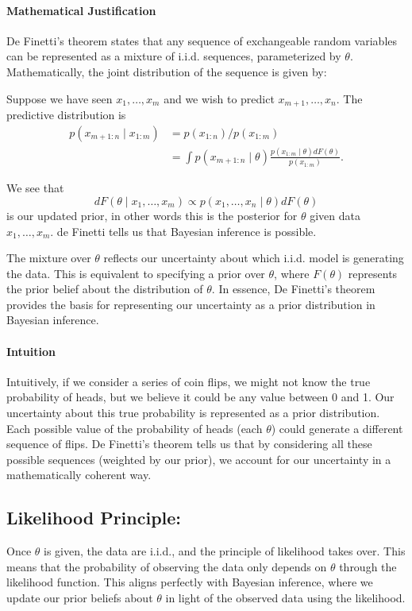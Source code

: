 \documentclass{article}
\begin{document}
\paragraph{Mathematical Justification}
De Finetti's theorem states that any sequence of exchangeable random variables can be represented as a mixture of i.i.d. sequences, parameterized by \( \theta \). Mathematically, the joint distribution of the sequence is given by:

Suppose we have seen $x_1, \ldots, x_m$ and we wish to predict $x_{m+1}, \ldots, x_n$. The predictive distribution is
$$
\begin{aligned}
p\left(x_{m+1: n} \mid x_{1: m}\right) & =p\left(x_{1: n}\right) / p\left(x_{1: m}\right) \\
& =\int p\left(x_{m+1: n} \mid \theta\right) \frac{p\left(x_{1: m} \mid \theta\right) d F(\theta)}{p\left(x_{1: m}\right)} .
\end{aligned}
$$

We see that
$$
d F\left(\theta \mid x_1, \ldots, x_m\right) \propto p\left(x_1, \ldots, x_n \mid \theta\right) d F(\theta)
$$
is our updated prior, in other words this is the posterior for $\theta$ given data $x_1, \ldots, x_m$. de Finetti tells us that Bayesian inference is possible.

The mixture over \( \theta \) reflects our uncertainty about which i.i.d. model is generating the data. This is equivalent to specifying a prior over \( \theta \), where \( F(\theta) \) represents the prior belief about the distribution of \( \theta \). In essence, De Finetti's theorem provides the basis for representing our uncertainty as a prior distribution in Bayesian inference.

\paragraph{Intuition}
Intuitively, if we consider a series of coin flips, we might not know the true probability of heads, but we believe it could be any value between 0 and 1. Our uncertainty about this true probability is represented as a prior distribution. Each possible value of the probability of heads (each \( \theta \)) could generate a different sequence of flips. De Finetti's theorem tells us that by considering all these possible sequences (weighted by our prior), we account for our uncertainty in a mathematically coherent way.






\subsection{Likelihood Principle:}
    Once \( \theta \) is given, the data are i.i.d., and the principle of likelihood takes over. This means that the probability of observing the data only depends on \( \theta \) through the likelihood function. This aligns perfectly with Bayesian inference, where we update our prior beliefs about \( \theta \) in light of the observed data using the likelihood.
\end{document}
